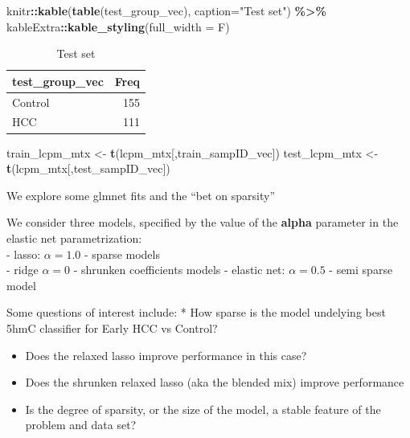 \documentclass[
]{book}
\newenvironment{Shaded}{\begin{snugshade}}{\end{snugshade}}
\newcommand{\DataTypeTok}[1]{\textcolor[rgb]{0.13,0.29,0.53}{#1}}
\newcommand{\KeywordTok}[1]{\textcolor[rgb]{0.13,0.29,0.53}{\textbf{#1}}}
\newcommand{\NormalTok}[1]{#1}
\newcommand{\OperatorTok}[1]{\textcolor[rgb]{0.81,0.36,0.00}{\textbf{#1}}}
\newcommand{\StringTok}[1]{\textcolor[rgb]{0.31,0.60,0.02}{#1}}
\begin{document}
\begin{Shaded}
\begin{Highlighting}[]
\NormalTok{knitr}\OperatorTok{::}\KeywordTok{kable}\NormalTok{(}\KeywordTok{table}\NormalTok{(test\_group\_vec),}
  \DataTypeTok{caption=}\StringTok{"Test set"}\NormalTok{) }\OperatorTok{\%>\%}
\StringTok{   }\NormalTok{kableExtra}\OperatorTok{::}\KeywordTok{kable\_styling}\NormalTok{(}\DataTypeTok{full\_width =}\NormalTok{ F)}
\end{Highlighting}
\end{Shaded}

\begin{table}

\caption{\label{tab:getTrainVal}Test set}
\centering
\begin{tabular}[t]{l|r}
\hline
test\_group\_vec & Freq\\
\hline
Control & 155\\
\hline
HCC & 111\\
\hline
\end{tabular}
\end{table}

\begin{Shaded}
\begin{Highlighting}[]
\NormalTok{train\_lcpm\_mtx <{-}}\StringTok{ }\KeywordTok{t}\NormalTok{(lcpm\_mtx[,train\_sampID\_vec])}
\NormalTok{test\_lcpm\_mtx <{-}}\StringTok{ }\KeywordTok{t}\NormalTok{(lcpm\_mtx[,test\_sampID\_vec])}
\end{Highlighting}
\end{Shaded}

We explore some glmnet fits and the ``bet on sparsity''

We consider three models, specified by the value of the
\textbf{alpha} parameter in the elastic net parametrization:\\
- lasso: \(\alpha = 1.0\) - sparse models\\
- ridge \(\alpha = 0\) - shrunken coefficients models
- elastic net: \(\alpha = 0.5\) - semi sparse model

Some questions of interest include:
* How sparse is the model undelying best 5hmC classifier for Early HCC vs Control?

\begin{itemize}
\item
  Does the relaxed lasso improve performance in this case?
\item
  Does the shrunken relaxed lasso (aka the blended mix) improve performance
\item
  Is the degree of sparsity, or the size of the model, a stable feature of the problem and data set?
\end{itemize}
\end{document}
